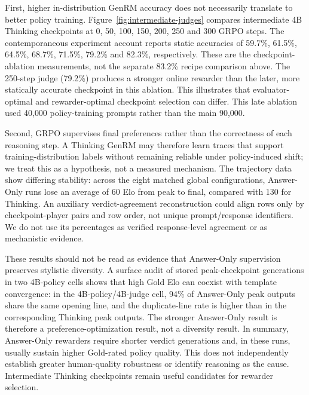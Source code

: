 \documentclass[11pt,letterpaper]{article}
\begin{document}
First, higher in-distribution GenRM accuracy does not necessarily translate to better policy training. Figure~\ref{fig:intermediate-judges} compares intermediate 4B Thinking checkpoints at 0, 50, 100, 150, 200, 250 and 300 GRPO steps. The contemporaneous experiment account reports static accuracies of 59.7\%, 61.5\%, 64.5\%, 68.7\%, 71.5\%, 79.2\% and 82.3\%, respectively. These are the checkpoint-ablation measurements, not the separate 83.2\% recipe comparison above. The 250-step judge (79.2\%) produces a stronger online rewarder than the later, more statically accurate checkpoint in this ablation. This illustrates that evaluator-optimal and rewarder-optimal checkpoint selection can differ. This late ablation used 40{,}000 policy-training prompts rather than the main 90{,}000.

Second, GRPO supervises final preferences rather than the correctness of each reasoning step. A Thinking GenRM may therefore learn traces that support training-distribution labels without remaining reliable under policy-induced shift; we treat this as a hypothesis, not a measured mechanism. The trajectory data show differing stability: across the eight matched global configurations, Answer-Only runs lose an average of 60 Elo from peak to final, compared with 130 for Thinking. An auxiliary verdict-agreement reconstruction could align rows only by checkpoint-player pairs and row order, not unique prompt/response identifiers. We do not use its percentages as verified response-level agreement or as mechanistic evidence.

These results should not be read as evidence that Answer-Only supervision preserves stylistic diversity. A surface audit of stored peak-checkpoint generations in two 4B-policy cells shows that high Gold Elo can coexist with template convergence: in the 4B-policy/4B-judge cell, 94\% of Answer-Only peak outputs share the same opening line, and the duplicate-line rate is higher than in the corresponding Thinking peak outputs. The stronger Answer-Only result is therefore a preference-optimization result, not a diversity result.
In summary, Answer-Only rewarders require shorter verdict generations and, in these runs, usually sustain higher Gold-rated policy quality. This does not independently establish greater human-quality robustness or identify reasoning as the cause. Intermediate Thinking checkpoints remain useful candidates for rewarder selection.
\end{document}
